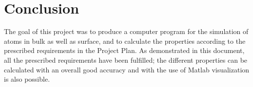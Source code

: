 \section{Conclusion}
The goal of this project was to produce a computer program for the simulation of atoms in bulk as well as surface, and to calculate the properties according to the prescribed requirements in the Project Plan. As demonstrated in this document, all the prescribed requirements have been fulfilled; the different properties can be calculated with an overall good accuracy and with the use of Matlab visualization is also possible.
